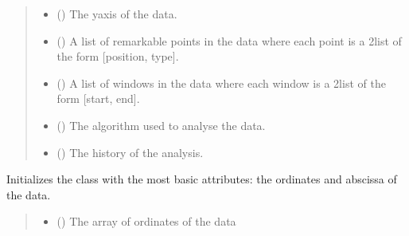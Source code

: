 \documentclass[letterpaper,10pt,english]{sphinxmanual}
\begin{document}
\begin{fulllineitems}
\begin{quote}
\begin{description}
\begin{itemize}
\item {} 
\sphinxAtStartPar
{} () \textendash{} The y\sphinxhyphen{}axis of the data.

\item {} 
\sphinxAtStartPar
{} () \textendash{} A list of remarkable points in the data where each point is a 2\sphinxhyphen{}list of the form {[}position, type{]}.

\item {} 
\sphinxAtStartPar
{} () \textendash{} A list of windows in the data where each window is a 2\sphinxhyphen{}list of the form {[}start, end{]}.

\item {} 
\sphinxAtStartPar
{} () \textendash{} The algorithm used to analyse the data.

\item {} 
\sphinxAtStartPar
{} () \textendash{} The history of the analysis.

\end{itemize}

\end{description}\end{quote}

\begin{fulllineitems}
\label{\detokenize{source/_autosummary/HDF5_BLS_analyse.Analyse_backend:HDF5_BLS_analyse.Analyse_backend.__init__}}
\pysigstartsignatures
\pysiglinewithargsret
{}
{\sphinxparamcomma {}}
{}
\pysigstopsignatures
\sphinxAtStartPar
Initializes the class with the most basic attributes: the ordinates and abscissa of the data.
\begin{quote}\begin{description}
\begin{itemize}
\item {} 
\sphinxAtStartPar
{} () \textendash{} The array of ordinates of the data


\end{itemize}
\end{description}
\end{quote}
\end{fulllineitems}
\end{fulllineitems}
\end{document}
